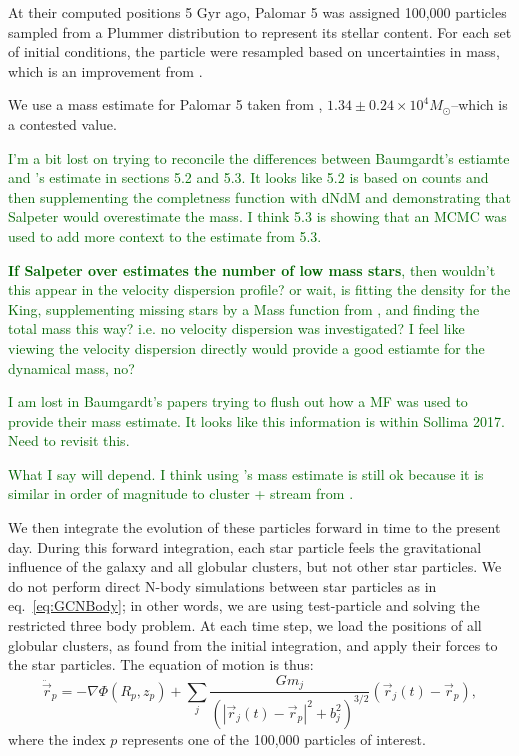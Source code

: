 \documentclass[draft]{aa}
\newcommand{\salvatore}[1]{\textcolor{darkgreen}{{#1}}}
\begin{document}
    At their computed positions 5 Gyr ago, Palomar 5 was assigned 100,000 particles sampled from a Plummer distribution to represent its stellar content. For each set of initial conditions, the particle were resampled based on uncertainties in mass, which is an improvement from \citet{2023A&A...673A..44F}. 

    We use a mass estimate for Palomar 5 taken from \citet{2021MNRAS.505.5957B}, $1.34\pm0.24\times10^{4}M_{\odot}$--which is a contested value. 
    
    \salvatore{I'm a bit lost on trying to reconcile the differences between Baumgardt's estiamte and \citet{2017ApJ...842..120I}'s estimate in sections 5.2 and 5.3. It looks like 5.2 is based on counts and then supplementing the completness function with dNdM \citet{2001AJ....122.3231G} and demonstrating that Salpeter would overestimate the mass. I think 5.3 is showing that an MCMC was used to add more context to the estimate from 5.3.}
    
    \salvatore{\textbf{If Salpeter over estimates the number of low mass stars}, then wouldn't this appear in the velocity dispersion profile? or wait, is \citet{2017ApJ...842..120I} fitting the density for the King, supplementing missing stars by a Mass function from \citet{2001AJ....122.3231G}, and finding the total mass this way? i.e. no velocity dispersion was investigated? I feel like viewing the velocity dispersion directly would provide a good estiamte for the dynamical mass, no?}
    
    \salvatore{I am lost in Baumgardt's papers trying to flush out how a MF was used to provide their mass estimate. It looks like this information is within Sollima 2017. Need to revisit this. }

    \salvatore{What I say will depend. I think using \citet{2021MNRAS.505.5957B}'s mass estimate is still ok because it is similar in order of magnitude to cluster + stream from \citet{2017ApJ...842..120I}. }


    We then integrate the evolution of these particles forward in time to the present day. During this forward integration, each star particle feels the gravitational influence of the galaxy and all globular clusters, but not other star particles. We do not perform direct N-body simulations between star particles as in eq.~\ref{eq:GCNBody}; in other words, we are using test-particle and solving the restricted three body problem. At each time step, we load the positions of all globular clusters, as found from the initial integration, and apply their forces to the star particles. The equation of motion is thus: 
    \begin{equation}
      \ddot{\vec{r}}_p = -\nabla \Phi(R_p,z_p) + \left.\sum_{j} \frac{Gm_j}{\left(|\vec{r}_j(t) - \vec{r}_p|^2 + b_j^2\right)^{3/2}}\right. \left(\vec{r}_j(t)- \vec{r}_p\right),
      \end{equation} \label{eq:equation_of_motion_particle} where the index $p$ represents one of the 100,000 particles of interest.
\end{document}
